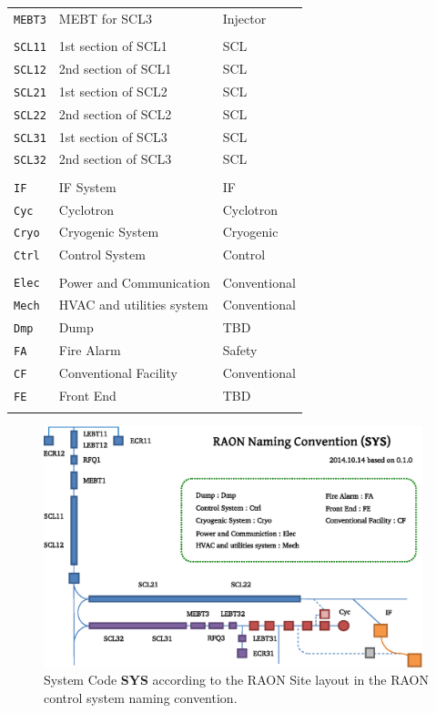 \documentclass[11pt
  , a4paper
  , article
  , oneside
]{memoir}
\begin{document}
\begin{center}
\begin{longtable}[t]{>{\raggedleft\arraybackslash}p{3cm} |p{7cm}| p{3cm}}
\texttt{MEBT3}  & MEBT for SCL3 & Injector\\
&\\
\texttt{SCL11} & 1st section of SCL1 & SCL\\
\texttt{SCL12} & 2nd section of SCL1 & SCL \\
\texttt{SCL21} & 1st section of SCL2 & SCL\\
\texttt{SCL22} & 2nd section of SCL2 & SCL \\
\texttt{SCL31} & 1st section of SCL3 & SCL\\
\texttt{SCL32} & 2nd section of SCL3 & SCL \\
&\\
\texttt{IF}    & IF System  & IF \\
\texttt{Cyc}   & Cyclotron  & Cyclotron \\
\texttt{Cryo}  & Cryogenic System & Cryogenic\\
\texttt{Ctrl}  & Control System   & Control \\
&\\
\texttt{Elec}  & Power and Communication & Conventional\\
\texttt{Mech}  & HVAC and utilities system & Conventional \\
\texttt{Dmp}   & Dump & TBD \\
\texttt{FA}    & Fire Alarm & Safety\\
\texttt{CF}    & Conventional Facility & Conventional\\
\texttt{FE}    & Front End & TBD \\
&\\
\end{longtable}
\end{center}


\begin{figure}[!htb]
  \centering
  \includegraphics[width=0.98\textwidth]{./images/naming-layout.eps}
  \caption{
            System Code \textbf{SYS} according to the RAON Site layout in the RAON control system naming convention.
          }
  \label{fig:naming-layout}   
\end{figure}
\end{document}
